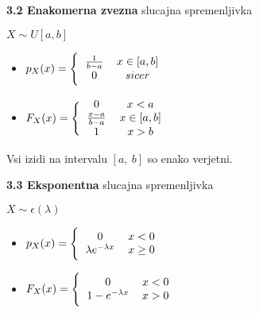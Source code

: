 \documentclass{article}
\begin{document}
\begin{multicols}{3}
\textbf{3.2 Enakomerna zvezna} slucajna spremenljivka
\begin{center}
    \begin{math}
        X \sim U[a, b]
    \end{math}
\end{center}

\begin{itemize}
    \item  \begin{math}
        p_{X}(x) =
        \Bigg \{\begin{tabular}{ccc}
          $\frac{1}{b-a}$  & $x \in [a, b]$ & \\
          $0$ & $sicer$ & \\
        \end{tabular}
    \end{math} 
    
     \item \begin{math}
        F_{X}(x) =
        \Bigg \{\begin{tabular}{ccc}
          $0$ & $x < a$ & \\
          $\frac{x - a}{b - a}$  & $x \in [a, b]$ & \\
          $1$ & $x > b$  & \\
        \end{tabular}
    \end{math}
\end{itemize}

Vsi izidi na intervalu $[a,\: b]$ so enako verjetni.

\textbf{3.3 Eksponentna} slucajna spremenljivka
\begin{center}
    \begin{math}
        X \sim \epsilon(\lambda)
    \end{math}
\end{center}

\begin{itemize}
    \item  \begin{math}
        p_{X}(x) =
        \Bigg \{\begin{tabular}{ccc}
          $0$  & $x < 0$ & \\
          $\lambda e^{- \lambda x}$ & $x \geq 0$ & \\
        \end{tabular}
    \end{math} 
    
     \item \begin{math}
        F_{X}(x) =
        \Bigg \{\begin{tabular}{ccc}
          $0$ & $x < 0$ & \\
          $1 - e^{- \lambda x}$ & $x > 0$  & \\
        \end{tabular}
    \end{math}
\end{itemize}


\end{multicols}
\end{document}
